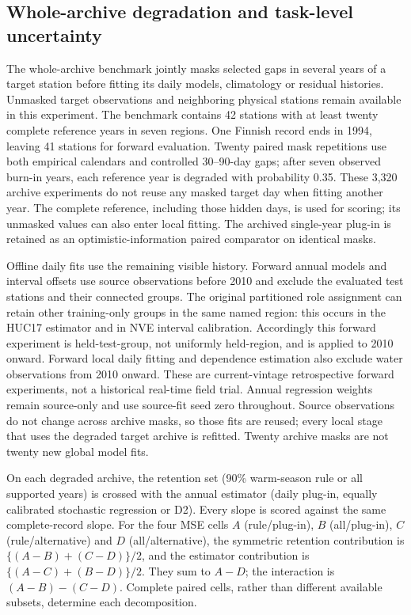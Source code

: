 \subsection{Whole-archive degradation and task-level uncertainty}
The whole-archive benchmark jointly masks selected gaps in several years of a target station before fitting its daily models, climatology or residual histories. Unmasked target observations and neighboring physical stations remain available in this experiment. The benchmark contains 42 stations with at least twenty complete reference years in seven regions. One Finnish record ends in 1994, leaving 41 stations for forward evaluation. Twenty paired mask repetitions use both empirical calendars and controlled 30--90-day gaps; after seven observed burn-in years, each reference year is degraded with probability 0.35. These 3,320 archive experiments do not reuse any masked target day when fitting another year. The complete reference, including those hidden days, is used for scoring; its unmasked values can also enter local fitting. The archived single-year plug-in is retained as an optimistic-information paired comparator on identical masks.

Offline daily fits use the remaining visible history. Forward annual models and interval offsets use source observations before 2010 and exclude the evaluated test stations and their connected groups. The original partitioned role assignment can retain other training-only groups in the same named region: this occurs in the HUC17 estimator and in NVE interval calibration. Accordingly this forward experiment is held-test-group, not uniformly held-region, and is applied to 2010 onward. Forward local daily fitting and dependence estimation also exclude water observations from 2010 onward. These are current-vintage retrospective forward experiments, not a historical real-time field trial. Annual regression weights remain source-only and use source-fit seed zero throughout. Source observations do not change across archive masks, so those fits are reused; every local stage that uses the degraded target archive is refitted. Twenty archive masks are not twenty new global model fits.

On each degraded archive, the retention set (90\% warm-season rule or all supported years) is crossed with the annual estimator (daily plug-in, equally calibrated stochastic regression or D2). Every slope is scored against the same complete-record slope. For the four MSE cells $A$ (rule/plug-in), $B$ (all/plug-in), $C$ (rule/alternative) and $D$ (all/alternative), the symmetric retention contribution is $\{(A-B)+(C-D)\}/2$, and the estimator contribution is $\{(A-C)+(B-D)\}/2$. They sum to $A-D$; the interaction is $(A-B)-(C-D)$. Complete paired cells, rather than different available subsets, determine each decomposition.

